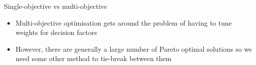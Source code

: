 \begin{frame}{Single-objective vs multi-objective}
    \begin{itemize}
        \pause\item Multi-objective optimisation gets around the problem of having to tune weights for
            decision factors
        \pause\item However, there are generally a large number of Pareto optimal solutions so we need some
            other method to tie-break between them
    \end{itemize}
\end{frame}


